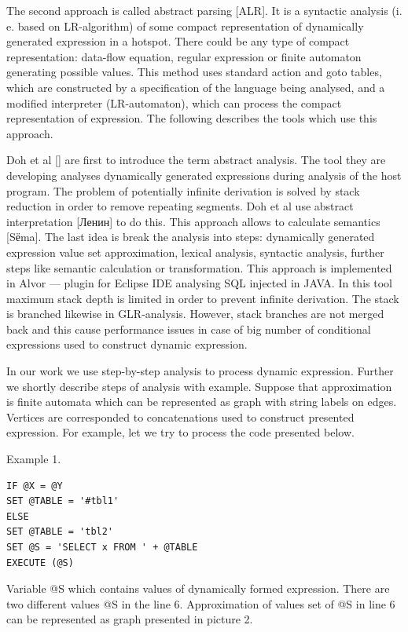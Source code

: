 \documentclass{sigplanconf}
\begin{document}
The second approach is called abstract parsing [ALR]. It is a syntactic analysis (i. e. based on LR-algorithm) of some compact representation of dynamically generated expression in a hotspot. There could be any type of compact representation: data-flow equation, regular expression or finite automaton generating possible values. This method uses standard action and goto tables, which are constructed by a specification of the language being analysed, and a modified interpreter (LR-automaton), which can process the compact representation of expression. The following describes the tools which use this approach. 

	Doh et al [] are first to introduce the term abstract analysis. The tool they are developing analyses dynamically generated expressions during analysis of the host program. The problem of potentially infinite derivation is solved by stack reduction in order to remove repeating segments. Doh et al use abstract interpretation [Ленин] to do this. This approach allows to calculate semantics [Sёma].
The last idea is break the analysis into steps: dynamically generated expression value set approximation, lexical analysis, syntactic analysis, further steps like semantic calculation or transformation. This approach is implemented in Alvor — plugin for Eclipse IDE analysing SQL injected in JAVA. In this tool maximum stack depth is limited in order to prevent infinite derivation. The stack is branched likewise in GLR-analysis. However, stack branches are not merged back and this cause performance issues in case of big number of conditional expressions used to construct dynamic expression.

In our work we use step-by-step analysis to process dynamic expression. Further we shortly describe steps of analysis with example. Suppose that approximation is finite automata which can be represented as graph with string labels on edges. Vertices are corresponded to concatenations used to construct presented expression. For example, let we try to process the code presented below.

Example 1.
\begin{verbatim}
IF @X = @Y
SET @TABLE = '#tbl1'
ELSE
SET @TABLE = 'tbl2'
SET @S = 'SELECT x FROM ' + @TABLE
EXECUTE (@S)
\end{verbatim}

Variable @S which contains values of dynamically formed expression. There are two different values @S in the line 6. Approximation of values set of @S in line 6 can be represented as graph presented in picture 2.
 
\end{document}
